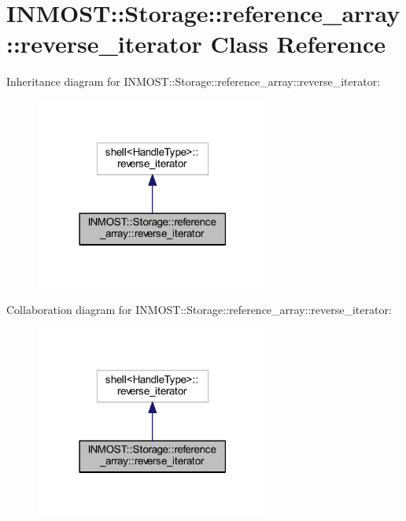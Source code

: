 \hypertarget{classINMOST_1_1Storage_1_1reference__array_1_1reverse__iterator}{\section{I\-N\-M\-O\-S\-T\-:\-:Storage\-:\-:reference\-\_\-array\-:\-:reverse\-\_\-iterator Class Reference}
\label{classINMOST_1_1Storage_1_1reference__array_1_1reverse__iterator}
}


Inheritance diagram for I\-N\-M\-O\-S\-T\-:\-:Storage\-:\-:reference\-\_\-array\-:\-:reverse\-\_\-iterator\-:
\nopagebreak
\begin{figure}[H]
\begin{center}
\leavevmode
\includegraphics[width=219pt]{classINMOST_1_1Storage_1_1reference__array_1_1reverse__iterator__inherit__graph}
\end{center}
\end{figure}


Collaboration diagram for I\-N\-M\-O\-S\-T\-:\-:Storage\-:\-:reference\-\_\-array\-:\-:reverse\-\_\-iterator\-:
\nopagebreak
\begin{figure}[H]
\begin{center}
\leavevmode
\includegraphics[width=219pt]{classINMOST_1_1Storage_1_1reference__array_1_1reverse__iterator__coll__graph}
\end{center}
\end{figure}
